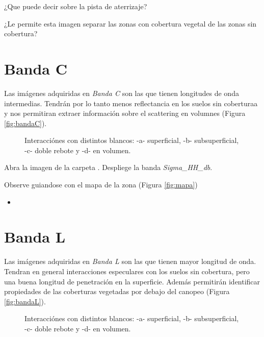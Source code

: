 \begin{que}
    ¿Que puede decir sobre la pista de aterrizaje?
\end{que}

\begin{que}
    ¿Le permite esta imagen separar las zonas con cobertura vegetal de las zonas sin cobertura?
\end{que}

\section{Banda C}

Las imágenes adquiridas en \emph{Banda C} son las que tienen longitudes de onda intermedias. Tendrán por lo tanto menos reflectancia en los suelos sin coberturaa y nos permitiran extraer información sobre el scattering en volumnes (Figura \ref{fig:bandaC}).

\begin{figure}[h!]
    \centering
    \caption{Interacciónes con distintos blancos: -a- superficial, -b- subsuperficial, -c- doble rebote y -d- en volumen.}
    \label{bandaC}
\end{figure}

Abra la imagen  de la carpeta . Despliege la banda \emph{Sigma\_HH_db}.

Observe guiandose con el mapa de la zona (Figura \ref{fig:mapa})
\begin{itemize}
    \item
\end{itemize}

\section{Banda L}

Las imágenes adquiridas en \emph{Banda L} son las que tienen mayor longitud de onda. Tendran en general interacciones especulares con los suelos sin cobertura, pero una buena longitud de penetración en la superficie. Además permitirán identificar propiedades de las coberturas vegetadas por debajo del canopeo (Figura \ref{fig:bandaL}).

\begin{figure}[h!]
    \centering
    \caption{Interacciónes con distintos blancos: -a- superficial, -b- subsuperficial, -c- doble rebote y -d- en volumen.}
    \label{bandaL}
\end{figure}

